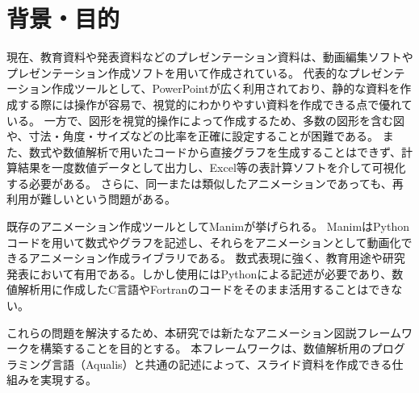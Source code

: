 \documentclass[twocolumn, a4paper]{ltjsarticle}
\begin{document}

\renewcommand{\lstlistingname}{ソースコード}


\section{背景・目的}
現在、教育資料や発表資料などのプレゼンテーション資料は、動画編集ソフトやプレゼンテーション作成ソフトを用いて作成されている。
代表的なプレゼンテーション作成ツールとして、PowerPoint\cite{Microsoft}が広く利用されており、静的な資料を作成する際には操作が容易で、視覚的にわかりやすい資料を作成できる点で優れている。
一方で、図形を視覚的操作によって作成するため、多数の図形を含む図や、寸法・角度・サイズなどの比率を正確に設定することが困難である。
また、数式や数値解析で用いたコードから直接グラフを生成することはできず、計算結果を一度数値データとして出力し、Excel等の表計算ソフトを介して可視化する必要がある。
さらに、同一または類似したアニメーションであっても、再利用が難しいという問題がある。
\par
既存のアニメーション作成ツールとしてManim\cite{Manim}が挙げられる。
ManimはPythonコードを用いて数式やグラフを記述し、それらをアニメーションとして動画化できるアニメーション作成ライブラリである。
数式表現に強く、教育用途や研究発表において有用である。しかし使用にはPythonによる記述が必要であり、数値解析用に作成したC言語やFortranのコードをそのまま活用することはできない。

\par
これらの問題を解決するため、本研究では新たなアニメーション図説フレームワークを構築することを目的とする。
本フレームワークは、数値解析用のプログラミング言語（Aqualis）\cite{sugisakaAqualis}と共通の記述によって、スライド資料を作成できる仕組みを実現する。
\end{document}
